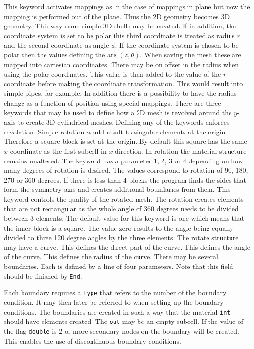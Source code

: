This keyword activates mappings as in the case of mappings in plane 
but now the mapping is performed 
out of the plane. 
Thus the 2D geometry becomes 3D geometry.
This way some simple 3D shells may be created. 
If in addition, the coordinate system is set to be polar this 
third coordinate is treated as radius $r$ and the second
coordinate as angle $\phi$. 
%
If the coordinate system is chosen to be polar then 
the values defining the are $(z,\theta)$.
When saving the mesh these are mapped into cartesian coordinates.
There may be on offset in the radius when using the polar coordinates.
This value is then added to the value of the $r$-coordinate before making the
coordinate transformation. This would result into simple pipes, for example.
In addition there is a possibility to have the radius change as a function
of position using special mappings.
%
There are three keywords that may be used to define how a 2D mesh is revolved
around the $y$-axis
to create 3D cylindrical meshes.
Defining any of the keywords enforces revolation.
Simple rotation would result to singular elements at the 
origin. Therefore a square block is set at the origin.
By default this square has the same $x$-coordinate as the
first subcell in $x$-direction.
In rotation the material structure remains unaltered. 
%
The keyword has a parameter 1, 2, 3 or 4 depending on 
how many degrees of rotation is desired. The values 
correspond to rotation of 90, 180, 270 or 360 degrees.
If there is less than 4
blocks the program finds the sides that form the 
symmetry axis and creates additional boundaries from them.   
%
This keyword controls the quality of the rotated mesh.
The rotation creates elements that are not rectangular as
the whole angle of 360 degrees needs to be divided between 3
elements. The default value for this keyword is one 
which means that the inner block is a square.
The value zero results to the angle being equally divided to three 
120 degree angles by the three elements.
%
The rotate structure may have a curve. This defines the 
direct part of the curve.
This defines the angle of the curve.
This defines the radius of the curve.
%
There may be several boundaries. Each is defined by a line
of four parameters. Note that this field should be finished by 
\texttt{End}. 

Each boundary requires a \texttt{type} that refers 
to the number of the boundary condition.
It may then later be referred to when setting 
up the boundary conditions.
The boundaries are created in such a way that
the material \texttt{int} should have elements
created. The \texttt{out} may be an empty subcell.
If the value of the flag \texttt{double} is 2 or more 
secondary nodes on the
boundary will be created. This enables the use of
discontinuous boundary conditions.

